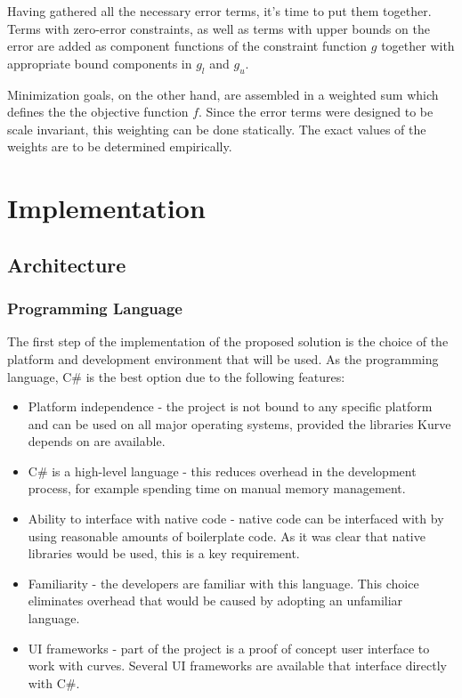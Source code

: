 \documentclass[a4paper]{article}
\begin{document}
				Having gathered all the necessary error terms, it's time to put them together. Terms with zero-error constraints, as well as terms with upper bounds on the error are added as component functions of the constraint function \(g\) together with appropriate bound components in \(g_l\) and \(g_u\).

				Minimization goals, on the other hand, are assembled in a weighted sum which defines the the objective function \(f\). Since the error terms were designed to be scale invariant, this weighting can be done statically. The exact values of the weights are to be determined empirically.


	\section{Implementation}

		\subsection{Architecture}
			
			\subsubsection{Programming Language}
			
				The first step of the implementation of the proposed solution is the choice of the platform and development environment that will be used. 
				As the programming language, C\# is the best option due to the following features:
				
				\begin{itemize}
				  	\item Platform independence - the project is not bound to any specific platform and can be used on all major operating systems, provided the libraries Kurve depends on are available. 
				  	\item C\# is a high-level language - this reduces overhead in the development process, for example spending time on manual memory management.
					\item Ability to interface with native code - native code can be interfaced with by using reasonable amounts of boilerplate code. As it was clear that native libraries would be used, this is a key requirement.
					\item Familiarity - the developers are familiar with this language. This choice eliminates overhead that would be caused by adopting an unfamiliar language.
					\item UI frameworks - part of the project is a proof of concept user interface to work with curves. Several UI frameworks are available that interface directly with C\#.
				\end{itemize}
			
\end{document}
